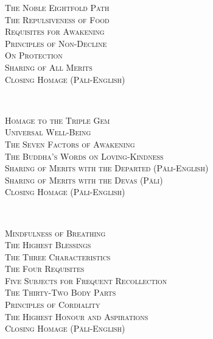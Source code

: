 {  \textsc{\fontsize{16}{28}\selectfont
    The Noble Eightfold Path \pageref{noble-eightfold-path}\\
    The Repulsiveness of Food \pageref{repulsiveness-of-food}\\
    Requisites for Awakening \pageref{requisites-for-awakening}\\
    Principles of Non-Decline \pageref{principles-of-non-decline}\\
    On Protection \pageref{protection}\\
    Sharing of All Merits \pageref{sharing-all-merits}\\
    Closing Homage (Pāli-English) \pageref{closing-homage}\\
  }

  \vspace{1.5cm}

  {\libertinusFont\selectfont\textbf{\textsc{\fontsize{18}{12}\selectfont{}}}}\\

  \textsc{\fontsize{16}{28}\selectfont
    Homage to the Triple Gem \pageref{dedication-of-offerings}\\
    Universal Well-Being \pageref{universal-well-being}\\
    The Seven Factors of Awakening \pageref{seven-factors-of-awakening}\\
    The Buddha's Words on Loving-Kindness \pageref{words-on-loving-kindness}\\
    Sharing of Merits with the Departed (Pāli-English) \pageref{sharing-merits-departed}\\
    Sharing of Merits with the Devas (Pāli) \pageref{sharing-merits-devas}\\
    Closing Homage (Pāli-English) \pageref{closing-homage}\\
  }

  \clearpage

  \vspace{1.5cm}

  {\libertinusFont\selectfont\textbf{\textsc{\fontsize{18}{12}\selectfont{}}}}\\

  \textsc{\fontsize{16}{28}\selectfont
    Mindfulness of Breathing \pageref{mindfulness-of-breathing}\\
    The Highest Blessings \pageref{highest-blessings}\\
    The Three Characteristics \pageref{three-characteristics}\\
    The Four Requisites \pageref{four-requisites}\\
    Five Subjects for Frequent Recollection \pageref{five-recollections}\\
    The Thirty-Two Body Parts \pageref{32-parts}\\
    Principles of Cordiality \pageref{principles-of-cordiality}\\
    The Highest Honour and Aspirations \pageref{highest-honour-aspirations}\\
    Closing Homage (Pāli-English) \pageref{closing-homage}\\
  }

}
